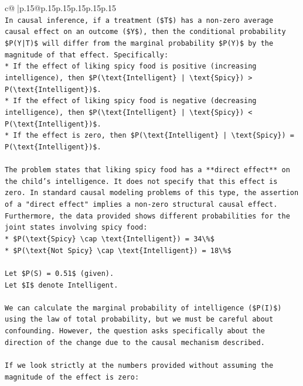 \documentclass{article}
\begin{document}
{\begin{supertabular}{c@{$\;$}|p{.15\linewidth}@{}p{.15\linewidth}p{.15\linewidth}p{.15\linewidth}p{.15\linewidth}p{.15\linewidth}}
{{{\\ 
\texttt{In causal inference, if a treatment (\$T\$) has a non{-}zero average causal effect on an outcome (\$Y\$), then the conditional probability \$P(Y|T)\$ will differ from the marginal probability \$P(Y)\$ by the magnitude of that effect. Specifically:} \\
\texttt{*   If the effect of liking spicy food is positive (increasing intelligence), then \$P(\textbackslash{}text\{Intelligent\} | \textbackslash{}text\{Spicy\}) > P(\textbackslash{}text\{Intelligent\})\$.} \\
\texttt{*   If the effect of liking spicy food is negative (decreasing intelligence), then \$P(\textbackslash{}text\{Intelligent\} | \textbackslash{}text\{Spicy\}) < P(\textbackslash{}text\{Intelligent\})\$.} \\
\texttt{*   If the effect is zero, then \$P(\textbackslash{}text\{Intelligent\} | \textbackslash{}text\{Spicy\}) = P(\textbackslash{}text\{Intelligent\})\$.} \\
\\ 
\texttt{The problem states that liking spicy food has a **direct effect** on the child's intelligence. It does not specify that this effect is zero. In standard causal modeling problems of this type, the assertion of a "direct effect" implies a non{-}zero structural causal effect. Furthermore, the data provided shows different probabilities for the joint states involving spicy food:} \\
\texttt{*   \$P(\textbackslash{}text\{Spicy\} \textbackslash{}cap \textbackslash{}text\{Intelligent\}) = 34\textbackslash{}\%\$} \\
\texttt{*   \$P(\textbackslash{}text\{Not Spicy\} \textbackslash{}cap \textbackslash{}text\{Intelligent\}) = 18\textbackslash{}\%\$} \\
\\ 
\texttt{Let \$P(S) = 0.51\$ (given).} \\
\texttt{Let \$I\$ denote Intelligent.} \\
\\ 
\texttt{We can calculate the marginal probability of intelligence (\$P(I)\$) using the law of total probability, but we must be careful about confounding. However, the question asks specifically about the direction of the change due to the causal mechanism described.} \\
\\ 
\texttt{If we look strictly at the numbers provided without assuming the magnitude of the effect is zero:} \\
}}}
\end{supertabular}}
\end{document}
